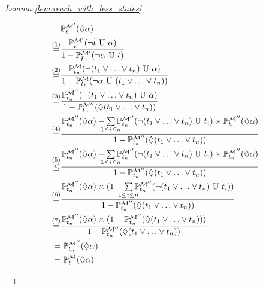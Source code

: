 \documentclass{llncs}
\newcommand{\Proba}            {\ensuremath{\mathbb{P}}}
\newcommand{\ssum}[2]{\sum\limits_{\mathclap{#1}^{#2}}}%
\newcommand{\ltlUntil}{\textnormal{ U }}
\newcommand{\ltlExists}{\ensuremath{\Diamond}}
\begin{document}
\begin{proof}[Lemma \ref{lem:reach_with_less_states}]
\begin{enumerate}
	\par\noindent
	\allowdisplaybreaks
	\begin{align*}
    	&
		\Proba^{\mathcal{M}^{\prime}}_{\bar{t}}(\ltlExists \alpha)
        \\
	 	\stackrel{(1)}{=} 
		&
        \frac{
			\Proba^{\mathcal{M}^{\prime}}_{\bar{t}}(\neg \bar{t} \ltlUntil \alpha)
		}{
		    1 - \Proba^{\mathcal{M}^{\prime}}_{\bar{t}}(\neg\alpha \ltlUntil \bar{t})
		} 
        \\
	 	\stackrel{(2)}{=} 
		&
        \frac{
			\Proba^{\mathcal{M}}_{t_n}(\neg(t_1 \lor \ldots \lor t_n) \ltlUntil \alpha)
		}{
		    1 - \Proba^{\mathcal{M}}_{t_n}(\neg\alpha \ltlUntil (t_1 \lor \ldots \lor t_n))
		} 
        \\
		\stackrel{(3)}{=} 
		&
        \frac{
			\Proba^{\mathcal{M}^{\prime\prime}}_{t_n}(\neg(t_1 \lor \ldots \lor t_n) \ltlUntil \alpha)
		}{
		    1 - \Proba^{\mathcal{M}^{\prime\prime}}_{t_n}(\ltlExists (t_1 \lor \ldots \lor t_n))
		} 
        \\
	 	\stackrel{(4)}{=} 
		&
		\frac{
			\Proba^{\mathcal{M}^{\prime\prime}}_{t_n}(\ltlExists \alpha) - 
		    \ssum{1 \leq i \leq n}{} 
            	\Proba^{\mathcal{M}^{\prime\prime}}_{t_n}(
                	\neg(t_1 \lor \ldots \lor t_n) \ltlUntil t_{i})
                \times \Proba^{\mathcal{M}^{\prime\prime}}_{t_i}(\ltlExists \alpha)
		}{
		    1 - \Proba^{\mathcal{M}^{\prime\prime}}_{t_n}(\ltlExists (t_1 \lor \ldots \lor t_n))
		} 
        \\
	 	\stackrel{(5)}{\leq} 
		&
		\frac{
			\Proba^{\mathcal{M}^{\prime\prime}}_{t_n}(\ltlExists \alpha) - 
		    \ssum{1 \leq i \leq n}{} 
            	\Proba^{\mathcal{M}^{\prime\prime}}_{t_n}(
                	\neg(t_1 \lor \ldots \lor t_n) \ltlUntil t_{i})
                \times \Proba^{\mathcal{M}^{\prime\prime}}_{t_n}(\ltlExists \alpha)
		}{
		    1 - \Proba^{\mathcal{M}^{\prime\prime}}_{t_n}(\ltlExists (t_1 \lor \ldots \lor t_n))
		} 
        \\
	 	\stackrel{(6)}{=} 
		&
		\frac{
			\Proba^{\mathcal{M}^{\prime\prime}}_{t_n}(\ltlExists \alpha) \times
            (1 - 
		    \ssum{1 \leq i \leq n}{} 
            	\Proba^{\mathcal{M}^{\prime\prime}}_{t_n}(
                	\neg(t_1 \lor \ldots \lor t_n) \ltlUntil t_{i})
            )
		}{
		    1 - \Proba^{\mathcal{M}^{\prime\prime}}_{t_n}(\ltlExists (t_1 \lor \ldots \lor t_n))
		} 
        \\
	 	\stackrel{(7)}{=} 
		&
		\frac{
			\Proba^{\mathcal{M}^{\prime\prime}}_{t_n}(\ltlExists \alpha) \times
            (1 - 
		    \Proba^{\mathcal{M}^{\prime\prime}}_{t_n}(\ltlExists (t_1 \lor \ldots \lor t_n))
            )
		}{
		    1 - \Proba^{\mathcal{M}^{\prime\prime}}_{t_n}(\ltlExists (t_1 \lor \ldots \lor t_n))
		} 
        \\
		= 
		& ~
		\Proba^{\mathcal{M}^{\prime\prime}}_{t_n}(\ltlExists \alpha) \\
		= 
		& ~ \Proba^{\mathcal{M}}_{\bar{t}}(\ltlExists \alpha)
	\end{align*}
	

\end{enumerate}
\end{proof}
\end{document}
